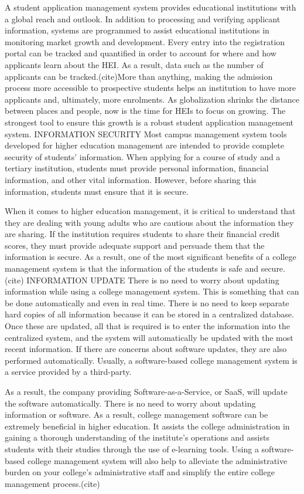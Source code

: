 A student application management system provides educational institutions with a global reach and outlook. In addition to processing and verifying applicant information, systems are programmed to assist educational institutions in monitoring market growth and development. Every entry into the registration portal can be tracked and quantified in order to account for where and how applicants learn about the HEI. As a result, data such as the number of applicants can be tracked.(cite)More than anything, making the admission process more accessible to prospective students helps an institution to have more applicants and, ultimately, more enrolments. As globalization shrinks the distance between places and people, now is the time for HEIs to focus on growing. The strongest tool to ensure this growth is a robust student application management system.
INFORMATION SECURITY
Most campus management system tools developed for higher education management are intended to provide complete security of students' information. When applying for a course of study and a tertiary institution, students must provide personal information, financial information, and other vital information. However, before sharing this information, students must ensure that it is secure.

When it comes to higher education management, it is critical to understand that they are dealing with young adults who are cautious about the information they are sharing. If the institution requires students to share their financial credit scores, they must provide adequate support and persuade them that the information is secure. As a result, one of the most significant benefits of a college management system is that the information of the students is safe and secure. (cite)
INFORMATION UPDATE
There is no need to worry about updating information while using a college management system. This is something that can be done automatically and even in real time. There is no need to keep separate hard copies of all information because it can be stored in a centralized database.
Once these are updated, all that is required is to enter the information into the centralized system, and the system will automatically be updated with the most recent information. If there are concerns about software updates, they are also performed automatically. Usually, a software-based college management system is a service provided by a third-party.

As a result, the company providing Software-as-a-Service, or SaaS, will update the software automatically. There is no need to worry about updating information or software. As a result, college management software can be extremely beneficial in higher education. It assists the college administration in gaining a thorough understanding of the institute's operations and assists students with their studies through the use of e-learning tools. Using a software-based college management system will also help to alleviate the administrative burden on your college's administrative staff and simplify the entire college management process.(cite)

